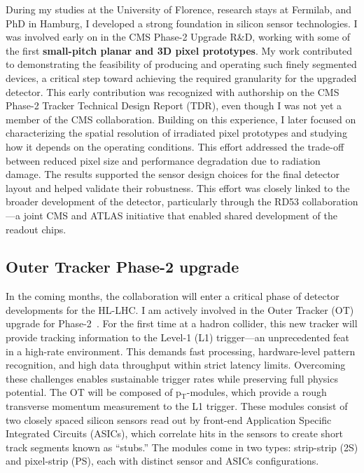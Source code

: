 {\begin{flushleft}
During my studies at the University of Florence, research stays at Fermilab, and PhD in Hamburg, I developed a strong foundation in silicon sensor technologies. I was involved early on in the CMS Phase-2 Upgrade R\&D, working with some of the first {\bf small-pitch planar and 3D pixel prototypes}. My work contributed to demonstrating the feasibility of producing and operating such finely segmented devices, a critical step toward achieving the required granularity for the upgraded detector. This early contribution was recognized with authorship on the CMS Phase-2 Tracker Technical Design Report (TDR), even though I was not yet a member of the CMS collaboration.
Building on this experience, I later focused on characterizing the spatial resolution of irradiated pixel prototypes and studying how it depends on the operating conditions. This effort addressed the trade-off between reduced pixel size and performance degradation due to radiation damage. The results supported the sensor design choices for the final detector layout and helped validate their robustness.
This effort was closely linked to the broader development of the detector, particularly through the RD53 collaboration—a joint CMS and ATLAS initiative that enabled shared development of the readout chips.
\vskip 4pt

\subsection{Outer Tracker Phase-2 upgrade}
\vskip 4pt 
In the coming months, the  collaboration will enter a critical phase of detector developments for the HL-LHC. I am actively involved in the Outer Tracker (OT) upgrade for Phase-2~\cite{[1]}. For the first time at a hadron collider, this new tracker will provide tracking information to the Level-1 (L1) trigger—an unprecedented feat in a high-rate environment. This demands fast processing, hardware-level pattern recognition, and high data throughput within strict latency limits. Overcoming these challenges enables sustainable trigger rates while preserving full physics potential. %
The OT will be composed of p$_{\mathrm{T}}$-modules, which provide a rough transverse momentum measurement to the L1 trigger. These modules consist of two closely spaced silicon sensors read out by front-end Application Specific Integrated Circuits (ASICs), which correlate hits in the sensors to create short track segments known as ``stubs.'' The modules come in two types: strip-strip (2S) and pixel-strip (PS), each with distinct sensor and ASICs  configurations. %


\end{flushleft}}

